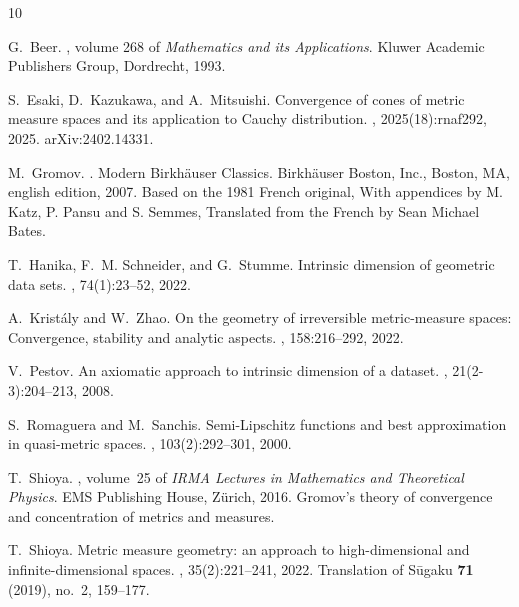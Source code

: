 \documentclass{amsart}
\theoremstyle{plain}
\theoremstyle{definition}
\theoremstyle{remark}
\begin{document}
\begin{thebibliography}{10}

G.~Beer.
, volume 268 of {\em
  Mathematics and its Applications}.
\newblock Kluwer Academic Publishers Group, Dordrecht, 1993.

S.~Esaki, D.~Kazukawa, and A.~Mitsuishi.
\newblock Convergence of cones of metric measure spaces and its application to
  {C}auchy distribution.
, 2025(18):rnaf292, 2025.
\newblock arXiv:2402.14331.

M.~Gromov.
.
\newblock Modern Birkh\"auser Classics. Birkh\"auser Boston, Inc., Boston, MA,
  english edition, 2007.
\newblock Based on the 1981 French original, With appendices by M. Katz, P.
  Pansu and S. Semmes, Translated from the French by Sean Michael Bates.

T.~Hanika, F.~M. Schneider, and G.~Stumme.
\newblock Intrinsic dimension of geometric data sets.
, 74(1):23--52, 2022.

A.~Krist{\'a}ly and W.~Zhao.
\newblock On the geometry of irreversible metric-measure spaces: Convergence,
  stability and analytic aspects.
,
  158:216--292, 2022.

V.~Pestov.
\newblock An axiomatic approach to intrinsic dimension of a dataset.
, 21(2-3):204--213, 2008.

S.~Romaguera and M.~Sanchis.
\newblock Semi-{Lipschitz} functions and best approximation in quasi-metric
  spaces.
, 103(2):292--301, 2000.

T.~Shioya.
, volume~25 of {\em IRMA Lectures in
  Mathematics and Theoretical Physics}.
\newblock EMS Publishing House, Z\"urich, 2016.
\newblock Gromov's theory of convergence and concentration of metrics and
  measures.

T.~Shioya.
\newblock Metric measure geometry: an approach to high-dimensional and
  infinite-dimensional spaces.
, 35(2):221--241, 2022.
\newblock Translation of S\={u}gaku \textbf{71} (2019), no.~2, 159--177.


\end{thebibliography}
\end{document}
